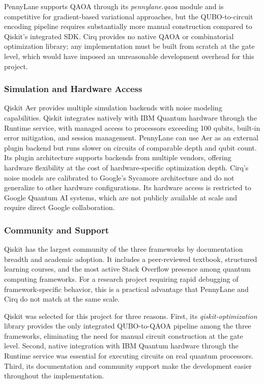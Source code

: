 \documentclass[a4paper]{report}
\begin{document}
{\begin{itemize}
PennyLane supports QAOA through its \textit{pennylane.qaoa} module and is competitive for gradient-based variational approaches, but the QUBO-to-circuit encoding pipeline requires substantially more manual construction compared to Qiskit's integrated SDK. Cirq provides no native QAOA or combinatorial optimization library; any implementation must be built from scratch at the gate level, which would have imposed an unreasonable development overhead for this project.
\subsubsection{Simulation and Hardware Access}
Qiskit Aer provides multiple simulation backends with noise modeling capabilities. Qiskit integrates natively with IBM Quantum hardware through the Runtime service, with managed access to processors exceeding 100 qubits, built-in error mitigation, and session management.
PennyLane can use Aer as an external plugin backend but runs slower on circuits of comparable depth and qubit count. Its plugin architecture supports backends from multiple vendors, offering hardware flexibility at the cost of hardware-specific optimization depth. Cirq's noise models are calibrated to Google's Sycamore architecture and do not generalize to other hardware configurations. Its hardware access is restricted to Google Quantum AI systems, which are not publicly available at scale and require direct Google collaboration.
\subsubsection{Community and Support}
Qiskit has the largest community of the three frameworks by documentation breadth and academic adoption. It includes a peer-reviewed textbook, structured learning courses, and the most active Stack Overflow presence among quantum computing frameworks. For a research project requiring rapid debugging of framework-specific behavior, this is a practical advantage that PennyLane and Cirq do not match at the same scale.


Qiskit was selected for this project for three reasons. First, its \textit{qiskit-optimization} library provides the only integrated QUBO-to-QAOA pipeline among the three frameworks, eliminating the need for manual circuit construction at the gate level. Second, native integration with IBM Quantum hardware through the Runtime service was essential for executing circuits on real quantum processors. Third, its documentation and community support make the development easier throughout the implementation. 


\end{itemize}}
\end{document}
